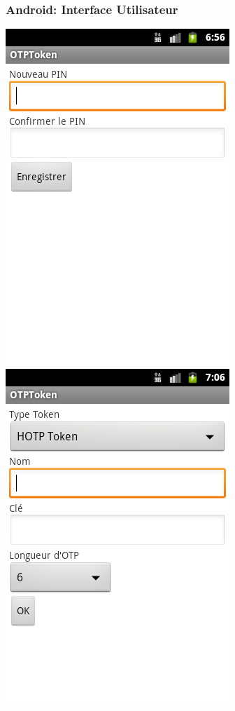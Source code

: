 \documentclass[xcolor=table]{beamer}
\begin{document}
\begin{frame}
\frametitle{Android: Interface Utilisateur}
\includegraphics[scale=0.33]{../graphics/enterpin.png}
\hspace{0.8em}
\includegraphics[scale=0.33]{../graphics/firstotp.png}
\hspace{0.8em}

\end{frame}
\end{document}
